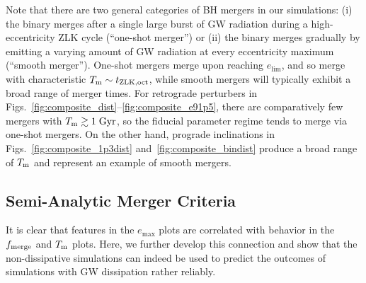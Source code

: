 \documentclass[
        fleqn,
        usenatbib,
    ]{mnras}
\begin{document}
Note that there are two general categories of BH mergers in our simulations: (i)
the binary merges after a single large burst of GW radiation during a
high-eccentricity ZLK cycle (``one-shot merger'') or (ii) the binary merges
gradually by emitting a varying amount of GW radiation at every eccentricity
maximum (``smooth merger''). One-shot mergers merge upon reaching $e_{\lim}$,
and so merge with characteristic $T_{\rm m} \sim t_{\rm ZLK, oct}$, while smooth
mergers will typically exhibit a broad range of merger times. For retrograde
perturbers in Figs.~\ref{fig:composite_dist}--\ref{fig:composite_e91p5}, there
are comparatively few mergers with $T_{\rm m} \gtrsim 1\;\mathrm{Gyr}$, so the
fiducial parameter regime tends to merge via one-shot mergers. On the other
hand, prograde inclinations in Figs.~\ref{fig:composite_1p3dist}
and~\ref{fig:composite_bindist} produce a broad range of $T_{\rm m}$ and
represent an example of smooth mergers.

\subsection{Semi-Analytic Merger Criteria}\label{ss:nogw_merger}

It is clear that features in the $e_{\max}$ plots are correlated with behavior
in the $f_{\rm merge}$ and $T_{\rm m}$ plots. Here, we further develop this
connection and show that the non-dissipative simulations can indeed be used to predict
the outcomes of simulations with GW dissipation rather reliably.
\end{document}
